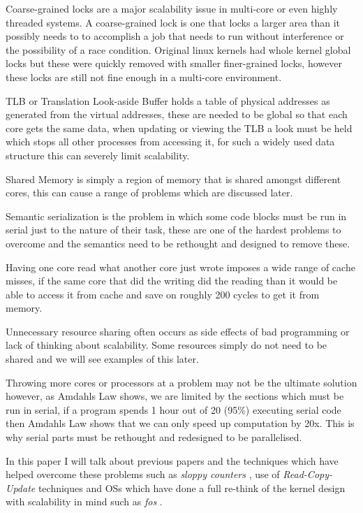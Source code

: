 \documentclass[journal]{IEEEtran}
\begin{document}
\vspace{5mm}

Coarse-grained locks are a major scalability issue in multi-core or even highly threaded systems. A coarse-grained lock is one that locks a larger area than it possibly needs to to accomplish a job that needs to run without interference or the possibility of a race condition. Original linux kernels had whole kernel global locks but these were quickly removed with smaller finer-grained locks, however these locks are still not fine enough in a multi-core environment.

TLB or Translation Look-aside Buffer holds a table of physical addresses as generated from the virtual addresses, these are needed to be global so that each core gets the same data, when updating or viewing the TLB a look must be held which stops all other processes from accessing it, for such a widely used data structure this can severely limit scalability.

Shared Memory is simply a region of memory that is shared amongst different cores, this can cause a range of problems which are discussed later.

Semantic serialization is the problem in which some code blocks must be run in serial just to the nature of their task, these are one of the hardest problems to overcome and the semantics need to be rethought and designed to remove these.

Having one core read what another core just wrote imposes a wide range of cache misses, if the same core that did the writing did the reading than it would be able to access it from cache and save on roughly 200 cycles to get it from memory.

Unnecessary resource sharing often occurs as side effects of bad programming or lack of thinking about scalability. Some resources simply do not need to be shared and we will see examples of this later.

Throwing more cores or processors at a problem may not be the ultimate solution however, as Amdahls Law \cite{Amdahl} shows, we are limited by the sections which must be run in serial, if a program spends 1 hour out of 20 (95\%) executing serial code then Amdahls Law shows that we can only speed up computation by 20x. This is why serial parts must be rethought and redesigned to be parallelised.

In this paper I will talk about previous papers and the techniques which have helped overcome these problems such as \emph{sloppy counters} \cite{sloppy-counters}, use of \emph{Read-Copy-Update} \cite{RCU} techniques and OSs which have done a full re-think of the kernel design with scalability in mind such as \emph{fos} \cite{fos}.
\end{document}
